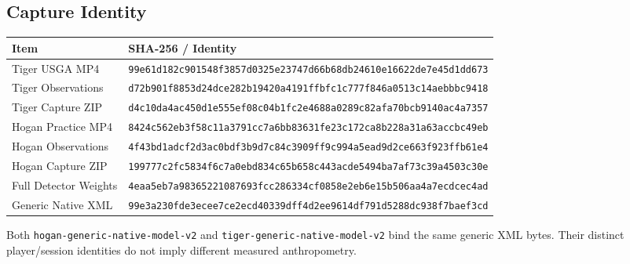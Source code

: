 \documentclass[11pt,letterpaper]{article}
\newcommand{\code}[1]{\nolinkurl{#1}}
\newcommand{\hash}[1]{{\footnotesize\nolinkurl{#1}}}
\begin{document}
\subsection{Capture Identity}
\begin{longtable}{@{}p{1.45in}p{4.85in}@{}}
\toprule Item & SHA-256 / Identity\\\midrule\endhead
Tiger USGA MP4 & \hash{99e61d182c901548f3857d0325e23747d66b68db24610e16622de7e45d1dd673}\\
Tiger Observations & \hash{d72b901f8853d24dce282b19420a4191ffbfc1c777f846a0513c14aebbbc9418}\\
Tiger Capture ZIP & \hash{d4c10da4ac450d1e555ef08c04b1fc2e4688a0289c82afa70bcb9140ac4a7357}\\
Hogan Practice MP4 & \hash{8424c562eb3f58c11a3791cc7a6bb83631fe23c172ca8b228a31a63accbc49eb}\\
Hogan Observations & \hash{4f43bd1adcf2d3ac0bdf3b9d7c84c3909ff9c994a5ead9d2ce663f923ffb61e4}\\
Hogan Capture ZIP & \hash{199777c2fc5834f6c7a0ebd834c65b658c443acde5494ba7af73c39a4503c30e}\\
Full Detector Weights & \hash{4eaa5eb7a98365221087693fcc286334cf0858e2eb6e15b506aa4a7ecdcec4ad}\\
Generic Native XML & \hash{99e3a230fde3ecee7ce2ecd40339dff4d2ee9614df791d5288dc938f7baef3cd}\\
\bottomrule
\end{longtable}
Both \code{hogan-generic-native-model-v2} and
\code{tiger-generic-native-model-v2} bind the same generic XML bytes.
Their distinct player/session identities do not imply different measured
anthropometry.
\end{document}
